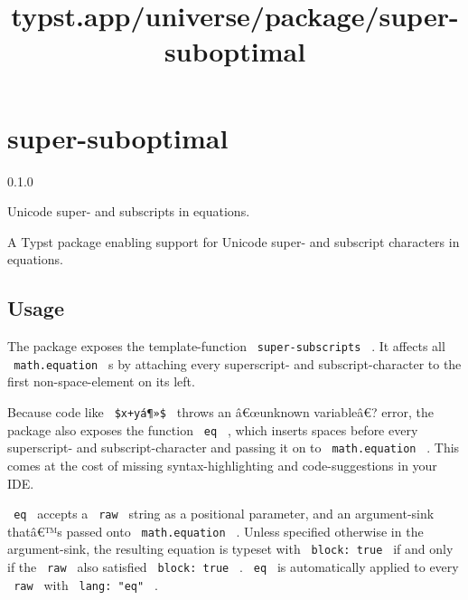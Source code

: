 \title{typst.app/universe/package/super-suboptimal}

\label{banner}
\section{super-suboptimal}\label{super-suboptimal}

{ 0.1.0 }

Unicode super- and subscripts in equations.

\label{readme}
A Typst package enabling support for Unicode super- and subscript
characters in equations.

\subsection{Usage}\label{usage}

The package exposes the template-function \texttt{\ super-subscripts\ }
. It affects all \texttt{\ math.equation\ } s by attaching every
superscript- and subscript-character to the first non-space-element on
its left.

\begin{Shaded}
\begin{Highlighting}[]

\NormalTok{$}
\NormalTok{$}
\end{Highlighting}
\end{Shaded}

\pandocbounded{}

Because code like \texttt{\ \$x+yá¶»\$\ } throws an â€œunknown
variableâ€? error, the package also exposes the function \texttt{\ eq\ }
, which inserts spaces before every superscript- and subscript-character
and passing it on to \texttt{\ math.equation\ } . This comes at the cost
of missing syntax-highlighting and code-suggestions in your IDE.

\texttt{\ eq\ } accepts a \texttt{\ raw\ } string as a positional
parameter, and an argument-sink thatâ€™s passed onto
\texttt{\ math.equation\ } . Unless specified otherwise in the
argument-sink, the resulting equation is typeset with
\texttt{\ block:\ true\ } if and only if the \texttt{\ raw\ } also
satisfied \texttt{\ block:\ true\ } . \texttt{\ eq\ } is automatically
applied to every \texttt{\ raw\ } with \texttt{\ lang:\ "eq"\ } .

